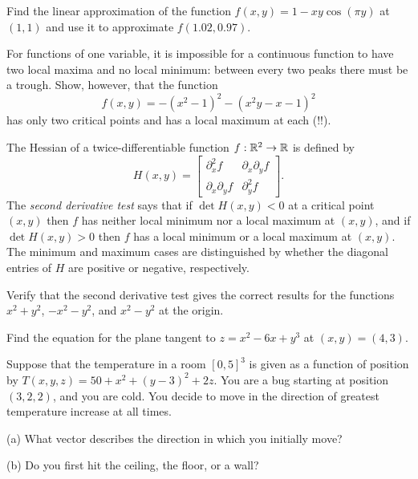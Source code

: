 \documentclass[prettycode,shellescape]{watsonbook}
\begin{document}
\begin{aexercise}
  Find the linear approximation of the function
  $f(x,y) = 1-xy\cos(\pi y)$ at $(1,1)$ and use it to approximate
  $f(1.02,0.97)$.
\end{aexercise}


\begin{aexercise}
  For functions of one variable, it is impossible for a continuous
  function to have two local maxima and no local minimum: between
  every two peaks there must be a trough. Show, however, that the
  function
  \[
    f(x,y) = -(x^2-1)^2-(x^2y-x-1)^2
  \]
  has only two critical points and has a local maximum at each (!!). 
\end{aexercise}


\begin{aexercise}
  The Hessian of a twice-differentiable function $f:\mathbb{R}^2 \to \mathbb{R}$ is
  defined by
  \[
    H(x,y) = \left[
      \begin{array}{cc}
        \partial_x^2 f & \partial_x\partial_y f \\
        \partial_x\partial_y f & \partial_y^2 f
      \end{array}
    \right]. 
  \]
  The \textit{second derivative test} says that if $\det H(x,y) < 0$
  at a critical point $(x,y)$ then $f$ has neither local minimum nor a
  local maximum at $(x,y)$, and if $\det H(x,y) > 0$ then $f$ has a
  local minimum or a local maximum at $(x,y)$. The minimum and maximum
  cases are distinguished by whether the diagonal entries of $H$ are
  positive or negative, respectively.

  Verify that the second derivative test gives the correct results for
  the functions $x^2+y^2$, $-x^2-y^2$, and $x^2 - y^2$ at the origin.
\end{aexercise}


\begin{aexercise}
  Find the equation for the plane tangent to $z=x^2-6x+y^3$ at
  $(x,y) = (4,3)$.
\end{aexercise}

\begin{aexercise}
  Suppose that the temperature in a room $[0,5]^3$ is given as a
  function of position by $T(x,y,z) = 50 + x^2 + (y-3)^2 + 2z$. You
  are a bug starting at position $(3,2,2)$, and you are cold. You
  decide to move in the direction of greatest temperature increase at
  all times.

  (a) What vector describes the direction in which you initially move?

  (b) Do you first hit the ceiling, the floor, or a wall?
\end{aexercise}
\end{document}
